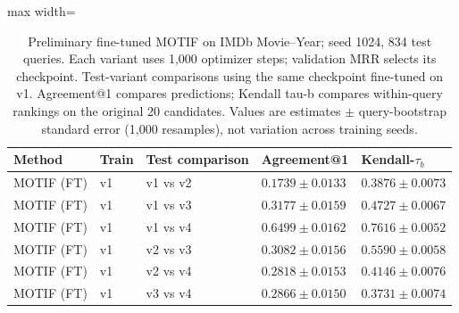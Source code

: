 \begin{table}[htbp]
\centering
\small
\renewcommand{\arraystretch}{1.15}
\setlength{\tabcolsep}{5pt}
\begin{adjustbox}{max width=\linewidth}
\begin{tabular}{|l|l|l|l|l|}
\hline
\textbf{Method} & \textbf{Train} & \textbf{Test comparison} & \textbf{Agreement@1} & \textbf{Kendall-$\tau_b$} \\
\hline
MOTIF (FT) & v1 & v1 vs v2 & $0.1739 \pm 0.0133$ & $0.3876 \pm 0.0073$ \\
\hline
MOTIF (FT) & v1 & v1 vs v3 & $0.3177 \pm 0.0159$ & $0.4727 \pm 0.0067$ \\
\hline
MOTIF (FT) & v1 & v1 vs v4 & $0.6499 \pm 0.0162$ & $0.7616 \pm 0.0052$ \\
\hline
MOTIF (FT) & v1 & v2 vs v3 & $0.3082 \pm 0.0156$ & $0.5590 \pm 0.0058$ \\
\hline
MOTIF (FT) & v1 & v2 vs v4 & $0.2818 \pm 0.0153$ & $0.4146 \pm 0.0076$ \\
\hline
MOTIF (FT) & v1 & v3 vs v4 & $0.2866 \pm 0.0150$ & $0.3731 \pm 0.0074$ \\
\hline
\end{tabular}
\end{adjustbox}
\caption{Preliminary fine-tuned MOTIF on IMDb Movie--Year; seed 1024, 834 test queries. Each variant uses 1,000 optimizer steps; validation MRR selects its checkpoint. Test-variant comparisons using the same checkpoint fine-tuned on v1. Agreement@1 compares predictions; Kendall tau-b compares within-query rankings on the original 20 candidates. Values are estimates $\pm$ query-bootstrap standard error (1,000 resamples), not variation across training seeds.}
\label{tab:motif-imdb-movie-year-matrix-transfer-comparisons-v1}
\end{table}

